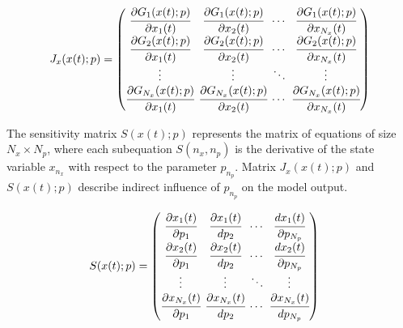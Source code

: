 \documentclass[../Article_Sensitivity_Analsysis.tex]{subfiles}
\begin{document}
	{\footnotesize
		\begin{align}
			\begingroup %
			\setlength\arraycolsep{2pt}
			{J_x}(x(t);p)=\begin{pmatrix}
				\cfrac{\partial {G_{1}}(x(t);p)}{\partial {x_{1}}(t)} & \cfrac{\partial {G_{1}}(x(t);p)}{\partial {x_{2}}(t)} & \cdots & \cfrac{\partial {G_{1}}(x(t);p)}{\partial {x_{N_x}}(t)}\\
				\cfrac{\partial {G_{2}}(x(t);p)}{\partial {x_{1}}(t)} & \cfrac{\partial {G_{2}}(x(t);p)}{\partial {x_{2}}(t)} & \cdots & \cfrac{\partial {G_{2}}(x(t);p)}{\partial {x_{N_x}}(t)}\\
				\vdots & \vdots & \ddots & \vdots\\ 
				\cfrac{\partial {G_{N_x}}(x(t);p)}{\partial {x_{1}}(t)} & \cfrac{\partial {G_{N_x}}(x(t);p)}{\partial {x_{2}}(t)} & \cdots & \cfrac{\partial {G_{N_x}}(x(t);p)}{\partial {x_{N_x}}(t)}\\
			\end{pmatrix}
			\endgroup
	\end{align} }
	
	The sensitivity matrix $S(x(t);p)$ represents the matrix of equations of size $N_x \times N_p$, where each subequation $S(n_x,n_p)$ is the derivative of the state variable $x_{n_x}$ with respect to the parameter $p_{n_p}$. Matrix ${J_x}(x(t);p)$ and $S(x(t);p)$ describe indirect influence of $p_{n_p}$ on the model output.
	
	{\footnotesize
		\begin{equation}
			\begin{split}
				S(x(t);p) & = 
				\begingroup %
				\setlength\arraycolsep{2pt}
				\begin{pmatrix}
					\cfrac{\partial {x_{1}}(t)}{\partial {p_{1}}} 	& \cfrac{\partial {x_{1}}(t)}{d {p_{2}}}     & \cdots & \cfrac{d {x_{1}}(t)}{\partial {p_{N_p}}}\\
					\cfrac{\partial {x_{2}}(t)}{\partial {p_{1}}} 	& \cfrac{\partial {x_{2}}(t)}{d {p_{2}}}     & \cdots & \cfrac{d {x_{2}}(t)}{\partial {p_{N_p}}}\\
					\vdots					 	    & \vdots 					   	  & \ddots & \vdots\\
					\cfrac{\partial {x_{N_x}}(t)}{\partial {p_{1}}} 	& \cfrac{\partial {x_{N_x}}(t)}{d {p_{2}}}     & \cdots & \cfrac{\partial {x_{N_x}}(t)}{d {p_{N_p}}}
				\end{pmatrix} 
				\endgroup
			\end{split}
	\end{equation} }
	
\end{document}

